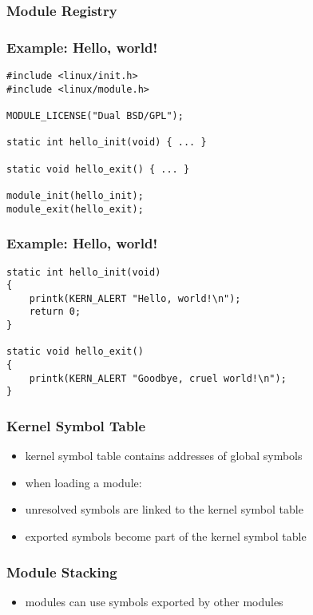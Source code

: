 \documentclass[dvipsnames]{beamer}
\begin{document}
\begin{frame}
  \frametitle{Module Registry}

  \begin{center}
  \end{center}
\end{frame}

\begin{frame}[fragile]
  \frametitle{Example: Hello, world!}

  \begin{lstlisting}
#include <linux/init.h>
#include <linux/module.h>

MODULE_LICENSE("Dual BSD/GPL");

static int hello_init(void) { ... }

static void hello_exit() { ... }

module_init(hello_init);
module_exit(hello_exit);
  \end{lstlisting}
\end{frame}

\begin{frame}[fragile]
  \frametitle{Example: Hello, world!}

  \begin{lstlisting}
static int hello_init(void)
{
    printk(KERN_ALERT "Hello, world!\n");
    return 0;
}

static void hello_exit()
{
    printk(KERN_ALERT "Goodbye, cruel world!\n");
}
  \end{lstlisting}
\end{frame}

\begin{frame}
  \frametitle{Kernel Symbol Table}

  \begin{itemize}
    \item kernel symbol table contains addresses of global symbols

    \bigskip
    \item when loading a module:
    \smallskip
    \item unresolved symbols are linked to the kernel symbol table
    \item exported symbols become part of the kernel symbol table
  \end{itemize}
\end{frame}

\begin{frame}
  \frametitle{Module Stacking}

  \begin{itemize}
    \item modules can use symbols exported by other modules
  \end{itemize}

  \medskip
  \begin{center}
  \end{center}
\end{frame}
\end{document}
